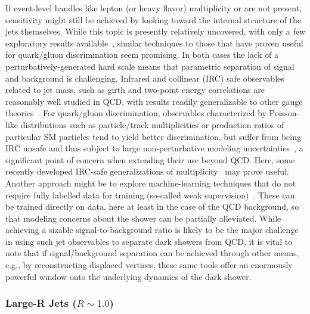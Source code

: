 If event-level handles like lepton (or heavy flavor) multiplicity or \MET are not present, sensitivity might still be achieved by looking toward the internal structure of the jets themselves. While this topic is presently relatively uncovered, with only a few exploratory results available~\cite{Park:2017rfb}, similar techniques to those that have proven useful for quark/gluon discrimination seem promising. In both cases the lack of a perturbatively-generated hard scale means that parametric separation of signal and background is challenging. Infrared and collinear (IRC) safe observables related to jet mass, such as girth and two-point energy correlations are reasonably well studied in QCD, with results readily generalizable to other gauge theories~\cite{Gallicchio:2010dq,Larkoski:2013eya,Larkoski:2014gra}. For quark/gluon discrimination, observables characterized by Poisson-like distributions such as particle/track multiplicities or production ratios of particular SM particles tend to yield better discrimination, but suffer from being IRC unsafe and thus subject to large non-perturbative modeling uncertainties~\cite{Gras:2017jty}, a significant point of concern when extending their use beyond QCD. Here, some recently developed IRC-safe generalizations of multiplicity~\cite{Frye:2017yrw} may prove useful. Another approach might be to explore machine-learning techniques that do not require fully labelled data for training (so-called weak supervision)~\cite{Dery:2017fap,Cohen:2017exh,Metodiev:2017vrx}. These can be trained directly on data, here at least in the case of the QCD background, so that modeling concerns about the shower can be partially alleviated. While achieving a sizable signal-to-background ratio is likely to be the major challenge in using such jet observables to separate dark showers from QCD, it is vital to note that if signal/background separation can be achieved through other means, e.g., by reconstructing displaced vertices, these same tools offer an enormously powerful window onto the underlying dynamics of the dark shower.

\subsubsection{Large-R Jets ($R \sim 1.0$)}
\label{sec:darkshowerfatjet}

